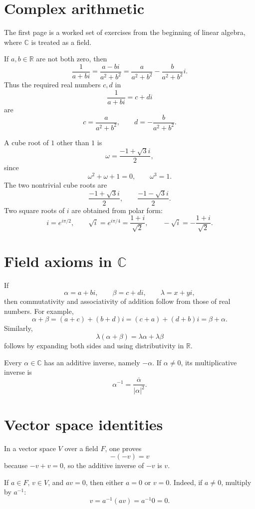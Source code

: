
\section{Complex arithmetic}

The first page is a worked set of exercises from the beginning of linear algebra, where \(\mathbb C\) is treated as a field.

If \(a,b\in\mathbb R\) are not both zero, then
\[
  \frac1{a+bi}=\frac{a-bi}{a^2+b^2}=\frac a{a^2+b^2}-\frac b{a^2+b^2}i.
\]
Thus the required real numbers \(c,d\) in
\[
  \frac1{a+bi}=c+di
\]
are
\[
  c=\frac a{a^2+b^2},\qquad d=-\frac b{a^2+b^2}.
\]

A cube root of \(1\) other than \(1\) is
\[
  \omega=\frac{-1+\sqrt3 i}{2},
\]
since
\[
  \omega^2+\omega+1=0,
  \qquad
  \omega^3=1.
\]
The two nontrivial cube roots are
\[
  \frac{-1+\sqrt3 i}{2},\qquad \frac{-1-\sqrt3 i}{2}.
\]
Two square roots of \(i\) are obtained from polar form:
\[
  i=e^{i\pi/2},\qquad
  \sqrt i=e^{i\pi/4}=\frac{1+i}{\sqrt2},\qquad
  -\sqrt i=-\frac{1+i}{\sqrt2}.
\]

\section[Field axioms in C]{Field axioms in \(\mathbb C\)}

If
\[
  \alpha=a+bi,\qquad \beta=c+di,\qquad \lambda=x+yi,
\]
then commutativity and associativity of addition follow from those of real numbers.  For example,
\[
  \alpha+\beta=(a+c)+(b+d)i=(c+a)+(d+b)i=\beta+\alpha.
\]
Similarly,
\[
  \lambda(\alpha+\beta)=\lambda\alpha+\lambda\beta
\]
follows by expanding both sides and using distributivity in \(\mathbb R\).

Every \(\alpha\in\mathbb C\) has an additive inverse, namely \(-\alpha\).  If \(\alpha\neq0\), its multiplicative inverse is
\[
  \alpha^{-1}=\frac{\overline\alpha}{|\alpha|^2}.
\]

\section{Vector space identities}

In a vector space \(V\) over a field \(F\), one proves
\[
  -(-v)=v
\]
because \(-v+v=0\), so the additive inverse of \(-v\) is \(v\).

If \(a\in F\), \(v\in V\), and \(av=0\), then either \(a=0\) or \(v=0\).  Indeed, if \(a\neq0\), multiply by \(a^{-1}\):
\[
  v=a^{-1}(av)=a^{-1}0=0.
\]

